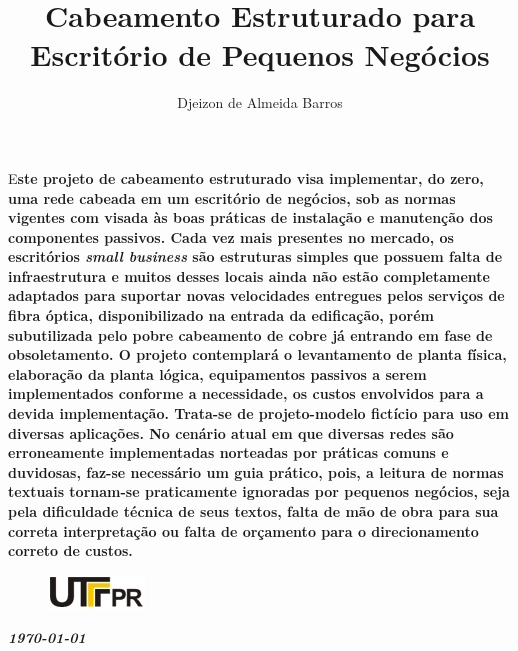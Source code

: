 \documentclass[	DIV=calc,%
							paper=a4,%
							fontsize=12pt,%
							onecolumn]{scrartcl}	 					%
\title{Cabeamento Estruturado para Escritório de Pequenos Negócios}
\author{Djeizon de Almeida Barros}  	%
\date{}																				%
\newcommand{\initial}[1]{%
     \lettrine[lines=3,lhang=0.3,nindent=0em]{
     				\color{DarkBlue}
     				{\textsf{#1}}}{}}
\begin{document}
\maketitle
\thispagestyle{fancy} 	
\thispagestyle{empty}		%



\initial{E}\textbf{ste projeto de cabeamento estruturado visa implementar, do zero, uma rede cabeada em um escritório de negócios, sob as normas vigentes com visada às boas práticas de instalação e manutenção dos componentes passivos. Cada vez mais presentes no mercado, os escritórios \textit{small business} são estruturas simples que possuem falta de infraestrutura e muitos desses locais ainda não estão completamente adaptados para suportar novas velocidades entregues pelos serviços de fibra óptica, disponibilizado na entrada da edificação, porém subutilizada pelo pobre cabeamento de cobre já entrando em fase de obsoletamento. O projeto contemplará o levantamento de planta física, elaboração da planta lógica, equipamentos passivos a serem implementados conforme a necessidade, os custos envolvidos para a devida implementação. Trata-se de projeto-modelo fictício para uso em diversas aplicações. No cenário atual em que diversas redes são erroneamente implementadas norteadas por práticas comuns e duvidosas, faz-se necessário um guia prático, pois, a leitura de normas textuais tornam-se praticamente ignoradas por pequenos negócios, seja pela dificuldade técnica de seus textos, falta de mão de obra para sua correta interpretação ou falta de orçamento para o direcionamento correto de custos.}


\begin{figure}
	\centering
	\includegraphics{utfpr}
\end{figure}

\vspace{2cm}
\centerline{\textit{\textbf{\today}}}

\clearpage
    \renewcommand*\listfigurename{Lista de figuras}
\listoffigures

\renewcommand*\listtablename{Lista de tabelas}
\listoftables
\end{document}
